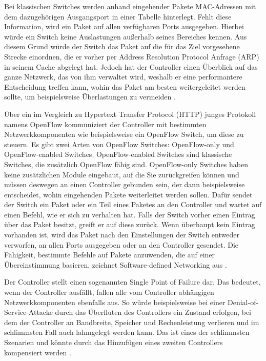 \documentclass[fontsize=12pt,paper=a4,open=any,parskip=half,
  twoside=false,toc=listof,toc=bibliography,fleqn,leqno,
  captions=nooneline,captions=tableabove,british]{scrbook}
\begin{document}
Bei klassischen Switches werden anhand eingehender Pakete MAC-Adressen mit dem dazugehörigen Ausgangsport in einer Tabelle hinterlegt. Fehlt diese Information, wird ein Paket auf allen verfügbaren Ports ausgegeben. Hierbei würde ein Switch keine Auslastungen außerhalb seines Bereiches kennen. Aus diesem Grund würde der Switch das Paket auf die für das Ziel vorgesehene Strecke einordnen, die er vorher per Address Resolution Protocol Anfrage (ARP) in seinem Cache abgelegt hat. Jedoch hat der Controller einen Überblick auf das ganze Netzwerk, das von ihm verwaltet wird, weshalb er eine performantere Entscheidung treffen kann, wohin das Paket am besten weitergeleitet werden sollte, um beispielsweise Überlastungen zu vermeiden \cite[1-2]{sdn1}. \par
Über ein im Vergleich zu Hypertext Transfer Protocol (HTTP) junges Protokoll namens OpenFlow kommuniziert der Controller mit bestimmten Netzwerkkomponenten wie beispielsweise ein OpenFlow Switch, um diese zu steuern. Es gibt zwei Arten von OpenFlow Switches: OpenFlow-only und OpenFlow-enabled Switches. OpenFlow-enabled Switches sind klassische Switches, die zusätzlich OpenFlow fähig sind. OpenFlow-only Switches haben keine zusätzlichen Module eingebaut, auf die Sie zurückgreifen können und müssen deswegen an einen Controller gebunden sein, der dann beispielsweise entscheidet, wohin eingehenden Pakete weiterleitet werden sollen. Dafür sendet der Switch ein Paket oder ein Teil eines Paketes an den Controller und wartet auf einen Befehl, wie er sich zu verhalten hat. Falls der Switch vorher einen Eintrag über das Paket besitzt, greift er auf diese zurück. Wenn überhaupt kein Eintrag vorhanden ist, wird das Paket nach den Einstellungen der Switch entweder verworfen, an allen Ports ausgegeben oder an den Controller gesendet. Die Fähigkeit, bestimmte Befehle auf Pakete anzuwenden, die auf einer Übereinstimmung basieren, zeichnet Software-defined Networking aus \cite[9-10]{sdn2}. \par
Der Controller stellt einen sogenannten Single Point of Failure dar. Das bedeutet, wenn der Controller ausfällt, fallen alle vom Controller abhängigen Netzwerkkomponenten ebenfalls aus. So würde beispielsweise bei einer Denial-of-Service-Attacke durch das Überfluten des Controllers ein Zustand erfolgen, bei dem der Controller an Bandbreite, Speicher und Rechenleistung verlieren und im schlimmsten Fall auch lahmgelegt werden kann. Das ist eines der schlimmsten Szenarien und könnte durch das Hinzufügen eines zweiten Controllers kompensiert werden \cite[3]{sdn3}.
\end{document}
